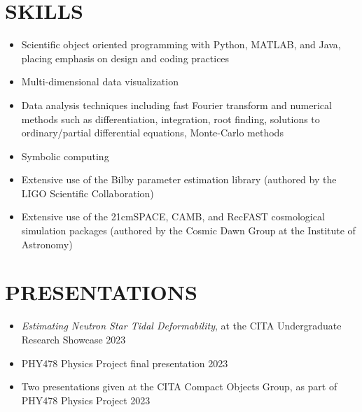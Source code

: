 \documentclass[a4paper,10pt]{extarticle}
\begin{document}
\section*{SKILLS}
\begin{itemize}
    \item Scientific object oriented programming with Python, MATLAB, and Java, placing emphasis on design and coding practices

    \item Multi-dimensional data visualization

    \item Data analysis techniques including fast Fourier transform and numerical methods such as differentiation, integration, root finding, solutions to ordinary/partial differential equations, Monte-Carlo methods

    \item Symbolic computing

    \item Extensive use of the Bilby parameter estimation library (authored by the LIGO Scientific Collaboration)

    \item Extensive use of the 21cmSPACE, CAMB, and RecFAST cosmological simulation packages (authored by the Cosmic Dawn Group at the Institute of Astronomy)
\end{itemize}

\section*{PRESENTATIONS}
\begin{itemize}
    \item \textit{Estimating Neutron Star Tidal Deformability}, at the CITA Undergraduate Research Showcase \hfill 2023

    \item PHY478 Physics Project final presentation \hfill 2023

    \item Two presentations given at the CITA Compact Objects Group, as part of PHY478 Physics Project \hfill 2023
\end{itemize}
\end{document}
